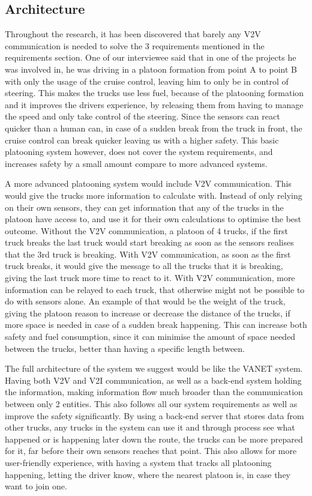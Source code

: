 % 
% 
\subsection{Architecture}
%
Throughout the research, it has been discovered that barely any \acrshort{V2V} communication is needed to solve the 3 requirements mentioned in the requirements section. One of our interviewee said that in one of the projects he was involved in, he was driving in a platoon formation from point A to point B with only the usage of the cruise control, leaving him to only be in control of steering. This makes the trucks use less fuel, because of the platooning formation and it improves the drivers experience, by releasing them from having to manage the speed and only take control of the steering. Since the sensors can react quicker than a human can, in case of a sudden break from the truck in front, the cruise control can break quicker leaving us with a higher safety. This basic platooning system however, does not cover the system requirements, and increases safety by a small amount compare to more advanced systems.\par
%
A more advanced platooning system would include \acrshort{V2V} communication. This would give the trucks more information to calculate with. Instead of only relying on their own sensors, they can get information that any of the trucks in the platoon have access to, and use it for their own calculations to optimise the best outcome. Without the \acrshort{V2V} communication, a platoon of 4 trucks, if the first truck breaks the last truck would start breaking as soon as the sensors realises that the 3rd truck is breaking. With \acrshort{V2V} communication, as soon as the first truck breaks, it would give the message to all the trucks that it is breaking, giving the last truck more time to react to it. With \acrshort{V2V} communication, more information can be relayed to each truck, that otherwise might not be possible to do with sensors alone. An example of that would be the weight of the truck, giving the platoon reason to increase or decrease the distance of the trucks, if more space is needed in case of a sudden break happening. This can increase both safety and fuel consumption, since it can minimise the amount of space needed between the trucks, better than having a specific length between.\par
%
The full architecture of the system we suggest would be like the \acrshort{VANET} system. Having both \acrshort{V2V} and \acrshort{V2I} communication, as well as a back-end system holding the information, making information flow much broader than the communication between only 2 entities. This also follows all our system requirements as well as improve the safety significantly. By using a back-end server that stores data from other trucks, any trucks in the system can use it and through process see what happened or is happening later down the route, the trucks can be more prepared for it, far before their own sensors reaches that point. This also allows for more user-friendly experience, with having a system that tracks all platooning happening, letting the driver know, where the nearest platoon is, in case they want to join one.
% 

